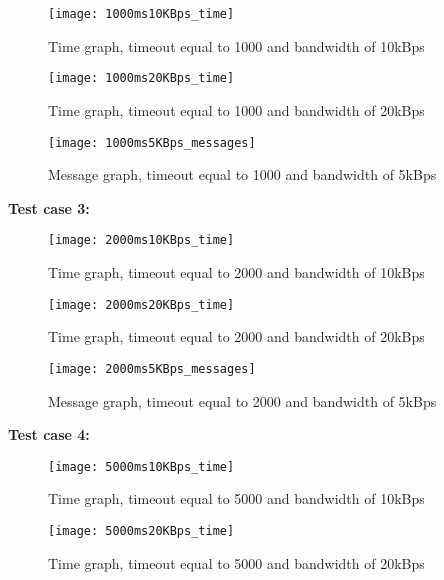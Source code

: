     \begin{figure}[H]
		\centering
		\texttt{[image: 1000ms10KBps\_time]}
		\caption{Time graph, timeout equal to 1000 and bandwidth of 10kBps} 
		\label{figure:results:1000ms10KBps_time}
	\end{figure}
	
	\begin{figure}[H]
		\centering
		\texttt{[image: 1000ms20KBps\_time]}
		\caption{Time graph, timeout equal to 1000 and bandwidth of 20kBps} 
		\label{figure:results:1000ms20KBps_time}
	\end{figure}
	
	\begin{figure}[H]
		\centering
		\texttt{[image: 1000ms5KBps\_messages]}
		\caption{Message graph, timeout equal to 1000 and bandwidth of 5kBps} 
		\label{figure:results:1000ms5KBps_messages}
	\end{figure}
    
    \textbf{Test case 3:}\\
    
    \begin{figure}[H]
		\centering
		\texttt{[image: 2000ms10KBps\_time]}
		\caption{Time graph, timeout equal to 2000 and bandwidth of 10kBps} 
		\label{figure:results:2000ms10KBps_time}
	\end{figure}
	
	\begin{figure}[H]
		\centering
		\texttt{[image: 2000ms20KBps\_time]}
		\caption{Time graph, timeout equal to 2000 and bandwidth of 20kBps} 
		\label{figure:results:2000ms20KBps_time}
	\end{figure}
	
	\begin{figure}[H]
		\centering
		\texttt{[image: 2000ms5KBps\_messages]}
		\caption{Message graph, timeout equal to 2000 and bandwidth of 5kBps} 
		\label{figure:results:2000ms5KBps_messages}
	\end{figure}
    
    \textbf{Test case 4:}\\
    
    \begin{figure}[H]
		\centering
		\texttt{[image: 5000ms10KBps\_time]}
		\caption{Time graph, timeout equal to 5000 and bandwidth of 10kBps} 
		\label{figure:results:5000ms10KBps_time}
	\end{figure}
	
	\begin{figure}[H]
		\centering
		\texttt{[image: 5000ms20KBps\_time]}
		\caption{Time graph, timeout equal to 5000 and bandwidth of 20kBps} 
		\label{figure:results:5000ms20KBps_time}
	\end{figure}
	
